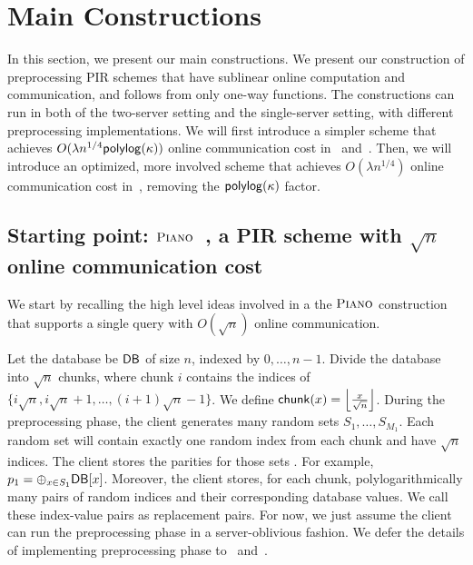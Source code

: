 
\section{Main Constructions}
In this section, we present our main constructions. %
We present our construction of preprocessing PIR schemes that have
sublinear online computation and communication, and follows from only one-way
functions. 
The constructions can run in both of the two-server setting and the single-server setting, with different preprocessing implementations.
We will first introduce a simpler scheme that achieves $O(\lambda
n^{1/4}\mathsf{polylog} (\kappa))$ online communication cost in~ and~. Then,
we will introduce an optimized, more involved scheme that achieves $O(\lambda
n^{1/4})$ online communication cost in~, removing the
$\mathsf{polylog} (\kappa)$ factor.

\label{sec:nquarter}
\label{sec:main}
\label{sec:main-scheme}

\subsection{Starting point: $\textsc{Piano}$~\cite{piano}, a PIR scheme with $\sqrt{n}$ online communication cost} 

We start by recalling the
high level ideas involved in a the $\textsc{Piano}$ construction that supports a single
query with $O(\sqrt{n})$ online communication.

Let the database be $\mathsf{DB}$  of size $n$, indexed by $0,\ldots,n-1$. Divide the
database into $\sqrt{n}$ chunks, where chunk $i$ contains the indices of
$\{i\sqrt{n},i\sqrt{n}+1,\dots,(i+1)\sqrt{n}-1\}$. We define
$\mathsf{chunk}(x)=\left\lfloor \frac{x}{\sqrt{n}}\right\rfloor$. During the
preprocessing phase, the client generates many random sets $S_1,\dots,S_{M_1}$.
Each random set will contain exactly one random index from each chunk and have
$\sqrt{n}$ indices. The client stores the parities for those sets . For example,
$p_1=\oplus_{x\in S_1}\mathsf{DB}[x]$. Moreover, the client stores, for each chunk,
polylogarithmically many pairs of random indices and their corresponding
database values. We call these index-value pairs as replacement pairs.
For now, we just assume the client can run the preprocessing phase in a server-oblivious fashion. 
We defer the details of implementing preprocessing phase to~ and~.

